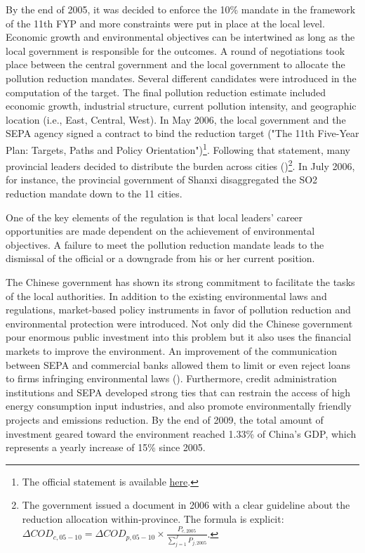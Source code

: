 \documentclass[12pt]{article}
\begin{document}
By the end of 2005, it was decided to enforce the 10\% mandate in the framework of the 11th FYP and more constraints were put in place at the local level. Economic growth and environmental objectives can be intertwined as long as the local government is responsible for the outcomes. A round of negotiations took place between the central government and the local government to allocate the pollution reduction mandates. Several different candidates were introduced in the computation of the target. The final pollution reduction estimate included economic growth, industrial structure, current pollution intensity, and geographic location (i.e., East, Central, West). In May 2006, the local government and the SEPA agency signed a contract to bind the reduction target ("The 11th Five-Year Plan: Targets, Paths and Policy Orientation")\footnote{The official statement is available \href{http://en.ndrc.gov.cn/newsrelease/200603/t20060323_63813.html}{here}.}. Following that statement, many provincial leaders decided to distribute the burden across cities (\cite{Liu2017-ib})\footnote{The government issued a document in 2006 with a clear guideline about the reduction allocation within-province. The formula is explicit: $\Delta C O D_{c, 05-10}=\Delta C O D_{p, 05-10} \times \frac{P_{c, 2005}}{\sum_{j=1}^{J} P_{j, 2005}}$.}. In July 2006, for instance, the provincial government of Shanxi disaggregated the SO2 reduction mandate down to the 11 cities.

One of the key elements of the regulation is that local leaders’ career opportunities are made dependent on the achievement of environmental objectives. A failure to meet the pollution reduction mandate leads to the dismissal of the official or a downgrade from his or her current position.

The Chinese government has shown its strong commitment to facilitate the tasks of the local authorities. In addition to the existing environmental laws and regulations, market-based policy instruments in favor of pollution reduction and environmental protection were introduced. Not only did the Chinese government pour enormous public investment into this problem but it also uses the financial markets to improve the environment. An improvement of the communication between SEPA and commercial banks allowed them to limit or even reject loans to firms infringing environmental laws (\cite{Oecd2008-pi}). Furthermore, credit administration institutions and SEPA developed strong ties that can restrain the access of high energy consumption input industries, and also promote environmentally friendly projects and emissions reduction. By the end of 2009, the total amount of investment geared toward the environment reached 1.33\% of China's GDP, which represents a yearly increase of 15\% since 2005. 
\end{document}
